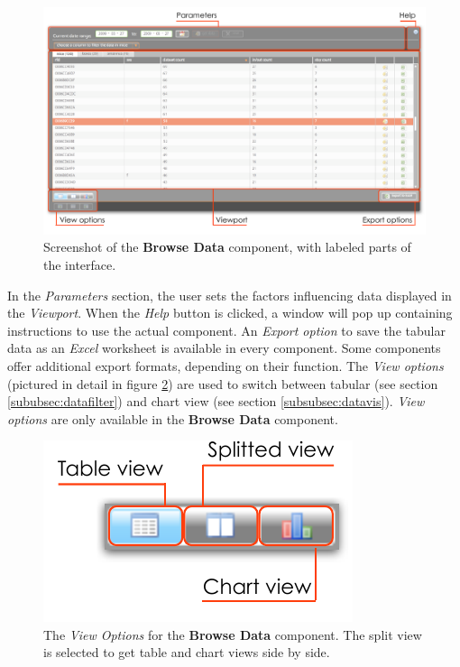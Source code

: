 \begin{figure}[!htbp]
\begin{center}
  \includegraphics[width=\textwidth]{assets/pdf/interface_component.pdf}
  \caption[\textit{Browse Data} component interface]{Screenshot of the \textbf{Browse Data} component, with labeled parts of the interface.}
  \label{fig:interface_component}
\end{center}
\end{figure}

In the \textit{Parameters} section, the user sets the factors influencing data displayed in the \textit{Viewport}. When the \textit{Help} button is clicked, a window will pop up containing instructions to use the actual component. An \textit{Export option} to save the tabular data as an \textit{Excel} worksheet is available in every component. Some components offer additional export formats, depending on their function. The \textit{View options} (pictured in detail in figure \ref{fig:view_options}) are used to switch between tabular (see section \ref{sububsec:datafilter}) and chart view (see section \ref{subsubsec:datavis}). \textit{View options} are only available in the \textbf{Browse Data} component.

\begin{figure}[htpb]
\begin{center}
\includegraphics[width=.3\textwidth]{assets/pdf/view_options.pdf}
\caption[View options]{The \textit{View Options} for the \textbf{Browse Data} component. The split view is selected to get table and chart views side by side.}
\label{fig:view_options}
\end{center}
\end{figure}    

